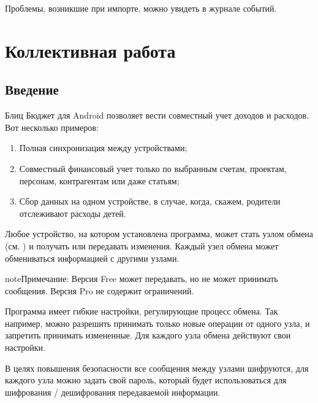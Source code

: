 \documentclass[a4paper,10pt,russian]{sphinxmanual}
\begin{document}
\sphinxAtStartPar
Проблемы, возникшие при импорте, можно увидеть в журнале событий.

\sphinxstepscope


\chapter{Коллективная работа}
\label{\detokenize{teamwork:chapter-teamwork}}\label{\detokenize{teamwork:id1}}\label{\detokenize{teamwork::doc}}

\section{Введение}
\label{\detokenize{teamwork:id2}}
\sphinxAtStartPar
Блиц Бюджет для Android позволяет вести совместный учет доходов и расходов. Вот несколько примеров:
\begin{enumerate}
%
\item {} 
\sphinxAtStartPar
Полная синхронизация между устройствами;

\item {} 
\sphinxAtStartPar
Совместный финансовый учет только по выбранным счетам, проектам, персонам, контрагентам или даже статьям;

\item {} 
\sphinxAtStartPar
Сбор данных на одном устройстве, в случае, когда, скажем, родители отслеживают расходы детей.

\end{enumerate}

\sphinxAtStartPar
Любое устройство, на котором установлена программа, может стать узлом обмена (см. {\hyperref[\detokenize{glossary:term-1}]{}}) и получать или передавать изменения. Каждый узел обмена может обмениваться информацией с другими узлами.

\begin{sphinxadmonition}{note}{Примечание:}
\sphinxAtStartPar
Версия Free может передавать, но не может принимать сообщения. Версия Pro не содержит ограничений.
\end{sphinxadmonition}

\sphinxAtStartPar
Программа имеет гибкие настройки, регулирующие процесс обмена. Так например, можно разрешить принимать только новые операции от одного узла, и запретить принимать измененные. Для каждого узла обмена действуют свои настройки.

\sphinxAtStartPar
В целях повышения безопасности все сообщения между узлами шифруются, для каждого узла можно задать свой пароль, который будет использоваться для шифрования / дешифрования передаваемой информации.
\end{document}
